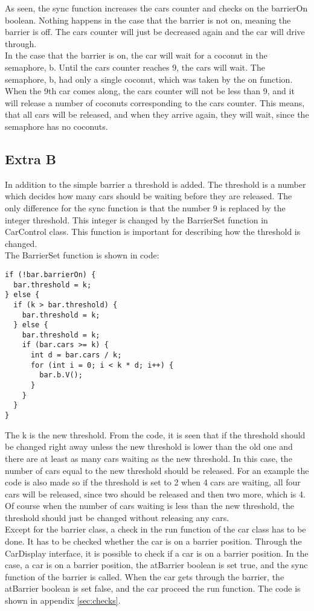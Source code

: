 As seen, the sync function increases the cars counter and checks on the barrierOn boolean. Nothing happens in the case that the barrier is not on, meaning the barrier is off. The cars counter will just be decreased again and the car will drive through. \\
In the case that the barrier is on, the car will wait for a coconut in the semaphore, b. Until the cars counter reaches 9, the cars will wait. The semaphore, b, had only a single coconut, which was taken by the on function. When the 9th car comes along, the cars counter will not be less than 9, and it will release a number of coconuts corresponding to the cars counter. This means, that all cars will be released, and when they arrive again, they will wait, since the semaphore has no coconuts. 

\subsection{Extra B}
In addition to the simple barrier a threshold is added. The threshold is a number which decides how many cars should be waiting before they are released. The only difference for the sync function is that the number 9 is replaced by the integer threshold. This integer is changed by the BarrierSet function in CarControl class. This function is important for describing how the threshold is changed.\\
The BarrierSet function is shown in code:

\begin{lstlisting}
if (!bar.barrierOn) {
  bar.threshold = k;
} else {
  if (k > bar.threshold) {
    bar.threshold = k;
  } else {
    bar.threshold = k;
    if (bar.cars >= k) {
      int d = bar.cars / k;
      for (int i = 0; i < k * d; i++) {
        bar.b.V();
      }
    }
  }
}
\end{lstlisting}
\vspace{.8cm}

The k is the new threshold. From the code, it is seen that if the threshold should be changed right away unless the new threshold is lower than the old one and there are at least as many cars waiting as the new threshold. In this case, the number of cars equal to the new threshold should be released. For an example the code is also made so if the threshold is set to 2 when 4 cars are waiting, all four cars will be released, since two should be released and then two more, which is 4. Of course when the number of cars waiting is less than the new threshold, the threshold should just be changed without releasing any cars.
\\

Except for the barrier class, a check in the run function of the car class has to be done. It has to be checked whether the car is on a barrier position. Through the CarDisplay interface, it is possible to check if a car is on a barrier position. In the case, a car is on a barrier position, the atBarrier boolean is set true, and the sync function of the barrier is called. When the car gets through the barrier, the atBarrier boolean is set false, and the car proceed the run function. The code is shown in appendix \ref{sec:checks}.